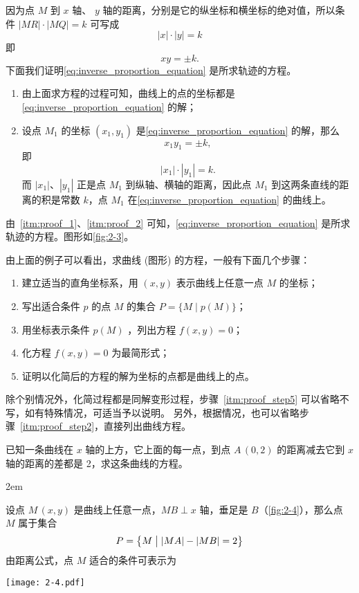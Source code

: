 \medskip
因为点 $M$ 到 $x$ 轴、 $y$ 轴的距离，分别是它的纵坐标和横坐标的绝对值，所以条件 $\left| {MR}\right| \cdot \left| {MQ}\right| = k$ 可写成
\[|x| \cdot |y| = k\]
即
\begin{equation}
\label{eq:inverse_proportion_equation} 
xy=\pm k.
\end{equation}
下面我们证明\cref{eq:inverse_proportion_equation} 是所求轨迹的方程。
\begin{enumerate}[1 ]
  \item\label{itm:proof_1} 由上面求方程的过程可知，曲线上的点的坐标都是\cref{eq:inverse_proportion_equation} 的解；
  \item\label{itm:proof_2} 设点 $M_1$ 的坐标 $(x_1,y_1)$ 是\cref{eq:inverse_proportion_equation} 的解，那么
  \[ x_1y_1=\pm k,\]
  即
  \[ |x_1|\cdot|y_1|=k.\]
  而 $|x_1|$、$|y_1|$ 正是点 $M_1$ 到纵轴、横轴的距离，因此点 $M_1$ 到这两条直线的距离的积是常数 $k$，点 $M_1$ 在\cref{eq:inverse_proportion_equation} 的曲线上。
\end{enumerate}

由~\ref{itm:proof_1}、\ref{itm:proof_2} 可知，\cref{eq:inverse_proportion_equation} 是所求轨迹的方程。图形如\cref{fig:2-3}。

由上面的例子可以看出，求曲线 (图形) 的方程，一般有下面几个步骤：
\begin{enumerate}
  \item\label{itm:proof_step1} 建立适当的直角坐标系，用 $(x,y)$ 表示曲线上任意一点 $M$ 的坐标；
  \item\label{itm:proof_step2} 写出适合条件 $p$ 的点 $M$ 的集合 $P = \{ M \mid p(M) \}$；
  \item\label{itm:proof_step3} 用坐标表示条件 $p(M)$ ，列出方程 $f(x,y)=0$；
  \item\label{itm:proof_step4} 化方程 $f(x,y)=0$ 为最简形式；
  \item\label{itm:proof_step5} 证明以化简后的方程的解为坐标的点都是曲线上的点。
\end{enumerate}

除个别情况外，化简过程都是同解变形过程，步骤~\ref{itm:proof_step5} 可以省略不写，如有特殊情况，可适当予以说明。
另外，根据情况，也可以省略步骤~\ref{itm:proof_step2}，直接列出曲线方程。

\begin{example}
  已知一条曲线在 $x$ 轴的上方，它上面的每一点，到点 $A\,(0,2)$ 的距离减去它到 $x$ 轴的距离的差都是 2，求这条曲线的方程。
\end{example}
\noindent
\begin{minipage}{0.6\linewidth}\parindent2em
\begin{solution}
  设点 $M\,(x,y)$ 是曲线上任意一点，$MB \perp x$ 轴，垂足是 $B$（\cref{fig:2-4}），那么点 $M$ 属于集合
  \[P = \bigl\{ M\bigm||MA|-|MB|= 2\bigr\}\]
  由距离公式，点 $M$ 适合的条件可表示为
\end{solution}
\end{minipage}\hfill
\begin{minipage}{0.35\linewidth}\centering
  \begin{figurehere}
    \texttt{[image: 2-4.pdf]}
    \caption{}\label{fig:2-4}
  \end{figurehere}
\end{minipage}


